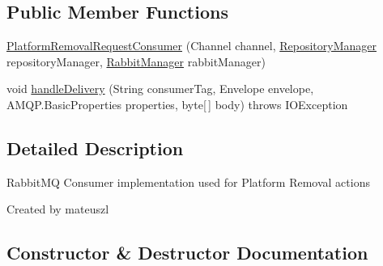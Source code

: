 \subsection*{Public Member Functions}
\begin{DoxyCompactItemize}
\item 
\hyperlink{classeu_1_1h2020_1_1symbiote_1_1messaging_1_1PlatformRemovalRequestConsumer_a9a9727ae5b7a3ccbc533aecc82b81327}{Platform\+Removal\+Request\+Consumer} (Channel channel, \hyperlink{classeu_1_1h2020_1_1symbiote_1_1repository_1_1RepositoryManager}{Repository\+Manager} repository\+Manager, \hyperlink{classeu_1_1h2020_1_1symbiote_1_1messaging_1_1RabbitManager}{Rabbit\+Manager} rabbit\+Manager)
\item 
void \hyperlink{classeu_1_1h2020_1_1symbiote_1_1messaging_1_1PlatformRemovalRequestConsumer_a0ae1d5429dd625ccad89f8cbb219fbf8}{handle\+Delivery} (String consumer\+Tag, Envelope envelope, A\+M\+Q\+P.\+Basic\+Properties properties, byte\mbox{[}$\,$\mbox{]} body)  throws I\+O\+Exception 
\end{DoxyCompactItemize}


\subsection{Detailed Description}
Rabbit\+MQ Consumer implementation used for Platform Removal actions

Created by mateuszl 

\subsection{Constructor \& Destructor Documentation}
